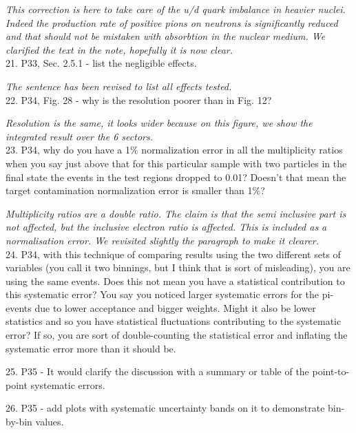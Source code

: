 \documentclass[12pt]{article}
\begin{document}
{\it This correction is here to take care of the u/d quark imbalance in heavier nuclei.
Indeed the production rate of positive pions on neutrons is significantly reduced and that
should not be mistaken with absorbtion in the nuclear medium. We clarified the text in the
note, hopefully it is now clear.} \\


21.
P33, Sec. 2.5.1 - list the negligible effects.

{\it The sentence has been revised to list all effects tested. } \\

22.
P34, Fig. 28 - why is the resolution poorer than in Fig. 12?

{\it Resolution is the same, it looks wider because on this figure, we show the integrated 
result over the 6 sectors.} \\


23.
P34, why do you have a 1\% normalization error in all the multiplicity ratios when you say just 
above that for this particular sample with two particles in the final state the events in the test 
regions dropped to 0.01?  Doesn’t that mean the target contamination normalization error is 
smaller than 1\%?

{\it Multiplicity ratios are a double ratio. The claim is that the semi inclusive part 
is not affected, but the inclusive electron ratio is affected. This is included
as a normalisation error. We revisited slightly the paragraph to make it clearer.} \\


24.
P34, with this technique of comparing results using the two different sets of variables (you 
call it two binnings, but I think that is sort of misleading), you are using the same events.  
Does this not mean you have a statistical contribution to this systematic error?  You say you 
noticed larger systematic errors for the pi- events due to lower acceptance and bigger 
weights.  Might it also be lower statistics and so you have statistical fluctuations contributing 
to the systematic error?  If so, you are sort of double-counting the statistical error and 
inflating the systematic error more than it should be.  



25.
P35 - It would clarify the discussion with a summary or table of the point-to-point systematic 
errors.



26.
P35 -
 add plots with systematic uncertainty bands on it to demonstrate bin-by-bin values.
\end{document}
